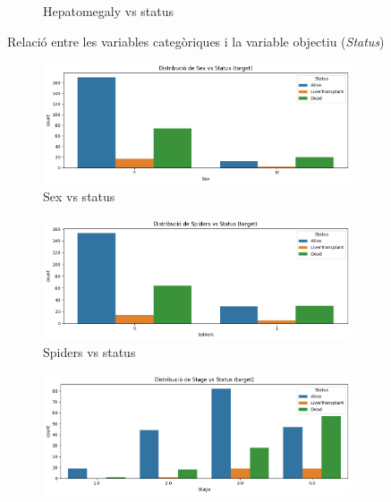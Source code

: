 \begin{figure}[H]
\begin{subfigure}[b]{0.5\textwidth}
    \caption{Hepatomegaly vs status}
    \label{fig:hepatomegaly_vs_status}
\end{subfigure}
\caption{Relació entre les variables categòriques i la variable objectiu (\textit{Status})}
\label{fig:cat-target-1}
\end{figure}

\begin{figure}[H]
\centering
\begin{subfigure}[b]{0.5\textwidth}
    \includegraphics[width=\textwidth]{img/corr_Sex_vs_status.png}
    \caption{Sex vs status}
    \label{fig:sex_vs_status}
\end{subfigure}%
\begin{subfigure}[b]{0.5\textwidth}
    \includegraphics[width=\textwidth]{img/corr_Spiders_vs_status.png}
    \caption{Spiders vs status}
    \label{fig:spiders_vs_status}
\end{subfigure}
\begin{subfigure}[b]{0.5\textwidth}
    \includegraphics[width=\textwidth]{img/corr_Stage_vs_status.png}

\end{subfigure}
\end{figure}
